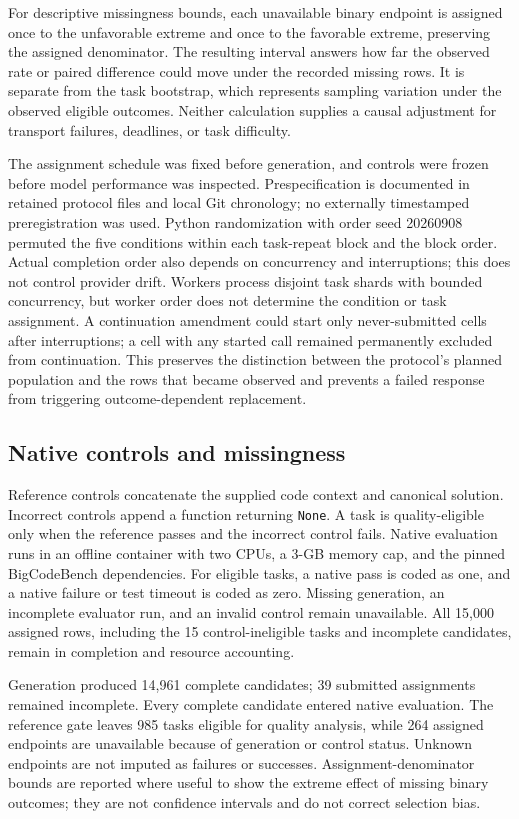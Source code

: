 For descriptive missingness bounds, each unavailable binary endpoint is assigned once to the unfavorable extreme and once to the favorable extreme, preserving the assigned denominator. The resulting interval answers how far the observed rate or paired difference could move under the recorded missing rows. It is separate from the task bootstrap, which represents sampling variation under the observed eligible outcomes. Neither calculation supplies a causal adjustment for transport failures, deadlines, or task difficulty.

The assignment schedule was fixed before generation, and controls were frozen before model performance was inspected. Prespecification is documented in retained protocol files and local Git chronology; no externally timestamped preregistration was used. Python randomization with order seed 20260908 permuted the five conditions within each task-repeat block and the block order. Actual completion order also depends on concurrency and interruptions; this does not control provider drift. Workers process disjoint task shards with bounded concurrency, but worker order does not determine the condition or task assignment. A continuation amendment could start only never-submitted cells after interruptions; a cell with any started call remained permanently excluded from continuation. This preserves the distinction between the protocol's planned population and the rows that became observed and prevents a failed response from triggering outcome-dependent replacement.

\subsection{Native controls and missingness}
Reference controls concatenate the supplied code context and canonical solution. Incorrect controls append a function returning \texttt{None}. A task is quality-eligible only when the reference passes and the incorrect control fails. Native evaluation runs in an offline container with two CPUs, a 3-GB memory cap, and the pinned BigCodeBench dependencies. For eligible tasks, a native pass is coded as one, and a native failure or test timeout is coded as zero. Missing generation, an incomplete evaluator run, and an invalid control remain unavailable. All 15,000 assigned rows, including the 15 control-ineligible tasks and incomplete candidates, remain in completion and resource accounting.

Generation produced 14,961 complete candidates; 39 submitted assignments remained incomplete. Every complete candidate entered native evaluation. The reference gate leaves 985 tasks eligible for quality analysis, while 264 assigned endpoints are unavailable because of generation or control status. Unknown endpoints are not imputed as failures or successes. Assignment-denominator bounds are reported where useful to show the extreme effect of missing binary outcomes; they are not confidence intervals and do not correct selection bias.

